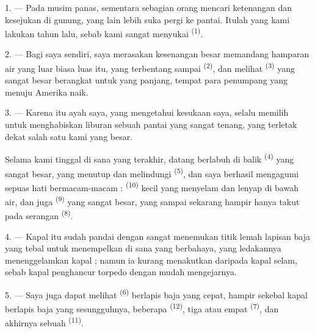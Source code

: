1. --- Pada musim panas, sementara sebagian orang mencari ketenangan
dan kesejukan di gunung, yang lain lebih suka pergi ke pantai. Itulah
yang kami lakukan tahun lalu, sebab kami sangat menyukai
 \textsuperscript{(1)}.

2. --- Bagi saya sendiri, saya merasakan kesenangan besar memandang
hamparan air yang luar biasa luas itu, yang terbentang sampai
 \textsuperscript{(2)}, dan melihat
 \textsuperscript{(3)} yang sangat besar
berangkat untuk  yang panjang, tempat para penumpang
yang menuju Amerika naik.

3. --- Karena itu ayah saya, yang mengetahui kesukaan saya, selalu
memilih untuk menghabiskan liburan sebuah pantai yang sangat tenang,
yang terletak dekat salah satu  kami
yang besar.

Selama kami tinggal di sana yang terakhir,  datang
berlabuh di balik  \textsuperscript{(4)} yang
sangat besar, yang menutup dan melindungi 
\textsuperscript{(5)}, dan saya berhasil mengagumi sepuas hati
bermacam-macam  : 
\textsuperscript{(10)} kecil yang menyelam dan lenyap di bawah air,
dan juga  \textsuperscript{(9)} yang sangat
besar, yang sampai sekarang hampir hanya takut pada serangan
 \textsuperscript{(8)}.

\VUsaut{3.0mm}
\VUsaut{3.0mm}

4. --- Kapal itu sudah pandai dengan sangat  menemukan
titik lemah lapisan baja yang tebal untuk menempelkan di sana
 yang berbahaya, yang ledakannya menenggelamkan kapal ;
namun ia kurang menakutkan daripada kapal selam, sebab kapal
penghancur torpedo dengan mudah mengejarnya.

5. --- Saya juga dapat melihat 
\textsuperscript{(6)} berlapis baja yang cepat, hampir sekebal kapal
berlapis baja yang sesungguhnya, beberapa 
\textsuperscript{(12)}, tiga atau empat 
\textsuperscript{(7)}, dan akhirnya sebuah 
\textsuperscript{(11)}. 

